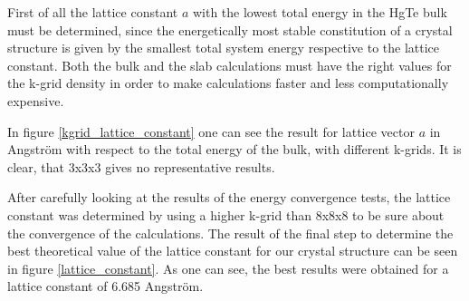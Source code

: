 	First of all the lattice constant $a$ with the lowest total energy in the HgTe bulk must be determined, since the energetically most stable constitution of a crystal structure is given by the smallest total system energy respective to the lattice constant.  
	Both the bulk and the slab calculations must have the right values for the k-grid density in order to make calculations faster and less computationally expensive. 		

	In figure \ref{kgrid_lattice_constant} one can see the result for lattice vector $a$ in Angström with respect to the total energy of the bulk, with different k-grids. It is clear, that 3x3x3 gives no representative results. 

	After carefully looking at the results of the energy convergence tests, the lattice constant was determined by using a higher k-grid than 8x8x8 to be sure about the convergence of the calculations. The result of the final step to determine the best theoretical value of the lattice constant for our crystal structure can be seen in figure \ref{lattice_constant}.
	As one can see, the best results were obtained for a lattice constant of 6.685 Angström.

